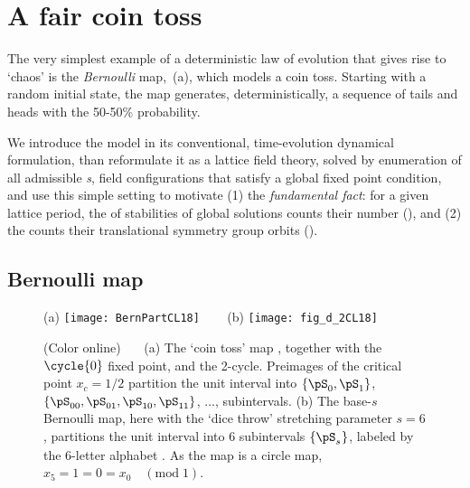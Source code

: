 
\section{A fair coin toss}
\label{s:coinToss}
\renewcommand{\ssp}{\ensuremath{x}}               %

The very simplest example of a deterministic law of evolution that gives
rise to `chaos' is the {\em Bernoulli} map, \,(a),
which models a
 {coin
toss}. Starting with a random initial state, the map generates,
deterministically,  a sequence of tails and heads with the 50-50\%
probability.

We introduce the model in its conventional, time-evolution dynamical
formulation, than reformulate it as a lattice field theory, solved by
enumeration of all admissible \emph{{\lattstate}s}, field configurations that
satisfy a  global fixed point condition, and use this simple setting to
motivate
(1) the \emph{fundamental fact}: for a given lattice period, the {\em
\HillDet} of stabilities of global solutions counts their number
(), and
(2) the {\tzeta} counts their translational symmetry group orbits
().

\subsection{Bernoulli map} %
\label{s:Bernoulli}


%
\begin{figure}
  \centering
{(a)}
\texttt{[image: BernPartCL18]}
~~~
{(b)}$\!\!\!\!$
\texttt{[image: fig\_d\_2CL18]}

  \caption{\label{fig:BernPart}
(Color online)~~~
(a)
The `coin toss' map , together with the
$\cycle{0}$ fixed point, and the  2-cycle. Preimages
of the critical point $\ssp_c=1/2$ partition the unit interval into
$\{\pS_0,\pS_1\}$, $\{\pS_{00},\pS_{01},\pS_{10},\pS_{11}\}$, $\dots$,
subintervals.
(b)
The base-${s}$ Bernoulli map, here with the `dice throw' stretching parameter ${s}=6$,
partitions the unit interval into $6$ subintervals $\{\pS_{\Ssym{}}\}$,
labeled by the ${6}$-letter alphabet . As the map is a
circle map, $\ssp_{5}=1=0=\ssp_{0} \quad(\mbox{mod}\;1)$.
          }
\end{figure}
%

